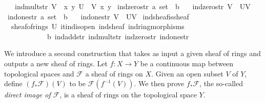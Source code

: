 \documentclass[12pt]{scrartcl}
\begin{document}
\begin{isabelle}
\ \ \ {\isachardoublequoteopen}ind{\isacharunderscore}{\kern0pt}mult{\isacharunderscore}{\kern0pt}str\ V\ {\isasymequiv}\ {\isasymlambda}x\ y{\isachardot}{\kern0pt}\ {\isasymcdot}\isactrlbsub {\isacharparenleft}{\kern0pt}U\ {\isasyminter}\ V{\isacharparenright}{\kern0pt}\isactrlesub \ x\ y{\isachardoublequoteclose}\isanewline
\isanewline
{}\isamarkupfalse%
\ ind{\isacharunderscore}{\kern0pt}zero{\isacharunderscore}{\kern0pt}str{\isacharcolon}{\kern0pt}{\isacharcolon}{\kern0pt}\ {\isachardoublequoteopen}{\isacharprime}{\kern0pt}a\ set\ {\isasymRightarrow}\ {\isacharprime}{\kern0pt}b{\isachardoublequoteclose}\isanewline
\ \ \ {\isachardoublequoteopen}ind{\isacharunderscore}{\kern0pt}zero{\isacharunderscore}{\kern0pt}str\ V\ {\isasymequiv}\ {\isasymzero}\isactrlbsub {\isacharparenleft}{\kern0pt}U{\isasyminter}V{\isacharparenright}{\kern0pt}\isactrlesub {\isachardoublequoteclose}\isanewline
\isanewline
{}\isamarkupfalse%
\ ind{\isacharunderscore}{\kern0pt}one{\isacharunderscore}{\kern0pt}str{\isacharcolon}{\kern0pt}{\isacharcolon}{\kern0pt}\ {\isachardoublequoteopen}{\isacharprime}{\kern0pt}a\ set\ {\isasymRightarrow}\ {\isacharprime}{\kern0pt}b{\isachardoublequoteclose}\isanewline
\ \ \ {\isachardoublequoteopen}ind{\isacharunderscore}{\kern0pt}one{\isacharunderscore}{\kern0pt}str\ V\ {\isasymequiv}\ {\isasymone}\isactrlbsub {\isacharparenleft}{\kern0pt}U{\isasyminter}V{\isacharparenright}{\kern0pt}\isactrlesub {\isachardoublequoteclose}\isanewline
\isanewline
{}\isamarkupfalse%
\ ind{\isacharunderscore}{\kern0pt}sheaf{\isacharunderscore}{\kern0pt}is{\isacharunderscore}{\kern0pt}sheaf{\isacharcolon}{\kern0pt}\isanewline
\ \ {\isachardoublequoteopen}sheaf{\isacharunderscore}{\kern0pt}of{\isacharunderscore}{\kern0pt}rings\ U\ it{\isachardot}{\kern0pt}ind{\isacharunderscore}{\kern0pt}is{\isacharunderscore}{\kern0pt}open\ ind{\isacharunderscore}{\kern0pt}sheaf\ ind{\isacharunderscore}{\kern0pt}ring{\isacharunderscore}{\kern0pt}morphisms\ \isanewline
\ \ \ \ \ \ \ \ \ \ \ \ b\ ind{\isacharunderscore}{\kern0pt}add{\isacharunderscore}{\kern0pt}str\ ind{\isacharunderscore}{\kern0pt}mult{\isacharunderscore}{\kern0pt}str\ ind{\isacharunderscore}{\kern0pt}zero{\isacharunderscore}{\kern0pt}str\ ind{\isacharunderscore}{\kern0pt}one{\isacharunderscore}{\kern0pt}str{\isachardoublequoteclose}\isanewline

\end{isabelle}

We introduce a second construction that takes as input a given sheaf of rings and outputs a new sheaf of rings. Let $f: X \rightarrow Y$ be a continuous map between topological spaces and $\mathscr{F}$ a sheaf of rings on $X$. Given an open subset $V$ of $Y$, define $(f_{*} \mathscr{F})(V)$ to be $\mathscr{F} (f^{-1}(V))$. We then prove $f_{*} \mathscr{F}$, the so-called \emph{direct image of  $\mathscr{F}$}, is a sheaf of rings on the topological space $Y$.  
\end{document}
